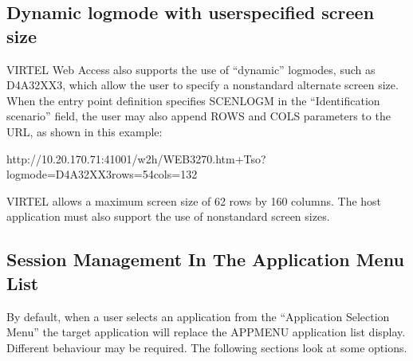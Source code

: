 \documentclass[letterpaper,10pt,english]{sphinxmanual}
\begin{document}
\ignorespaces 

\subsection{Dynamic logmode with user\sphinxhyphen{}specified screen size}
\label{\detokenize{Customization:dynamic-logmode-with-user-specified-screen-size}}\label{\detokenize{Customization:index-65}}
\sphinxAtStartPar
VIRTEL Web Access also supports the use of “dynamic” logmodes, such as D4A32XX3, which allow the user to specify a non\sphinxhyphen{}standard alternate screen size. When the entry point definition specifies SCENLOGM in the “Identification scenario” field, the user may also append ROWS and COLS parameters to the URL, as shown in this example:

\begin{sphinxVerbatim}[commandchars=\\\{\}]
http://10.20.170.71:41001/w2h/WEB3270.htm+Tso?logmode=D4A32XX3\PYGZam{}rows=54\PYGZam{}cols=132
\end{sphinxVerbatim}

\sphinxAtStartPar
VIRTEL allows a maximum screen size of 62 rows by 160 columns. The host application must also support the use of non\sphinxhyphen{}standard screen sizes.

\ignorespaces 

\subsection{Session Management In The Application Menu List}
\label{\detokenize{Customization:session-management-in-the-application-menu-list}}\label{\detokenize{Customization:index-66}}
\sphinxAtStartPar
By default, when a user selects an application from the “Application Selection Menu” the target application will replace the APPMENU application list display. Different behaviour may be required. The following sections look at some options.
\end{document}

